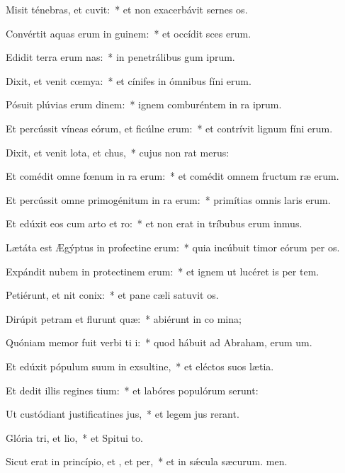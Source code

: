 \item Misit ténebras, et cuvit:~* et non exacerbávit sernes os.
\item Convértit aquas erum in guinem:~* et occídit sces erum.
\item Edidit terra erum nas:~* in penetrálibus gum iprum.
\item Dixit, et venit cœmya:~* et cínifes in ómnibus fíni erum.
\item Pósuit plúvias erum dinem:~* ignem comburéntem in ra iprum.
\item Et percússit víneas eórum, et ficúlne erum:~* et contrívit lignum fíni erum.
\item Dixit, et venit lota, et chus,~* cujus non rat merus:
\item Et comédit omne fœnum in ra erum:~* et comédit omnem fructum ræ erum.
\item Et percússit omne primogénitum in ra erum:~* primítias omnis laris erum.
\item Et edúxit eos cum arto et ro:~* et non erat in tríbubus erum inmus.
\item Lætáta est Ægýptus in profectine erum:~* quia incúbuit timor eórum per os.
\item Expándit nubem in protectinem erum:~* et ignem ut lucéret is per tem.
\item Petiérunt, et nit conix:~* et pane cæli satuvit os.
\item Dirúpit petram et flurunt quæ:~* abiérunt in co mina;
\item Quóniam memor fuit verbi ti i:~* quod hábuit ad Abraham, erum um.
\item Et edúxit pópulum suum in exsultine,~* et eléctos suos  lætia.
\item Et dedit illis regines tium:~* et labóres populórum serunt:
\item Ut custódiant justificatines jus,~* et legem jus rerant.
\item Glória tri, et lio,~* et Spitui to.
\item Sicut erat in princípio, et , et per,~* et in sǽcula sæcurum. men.
